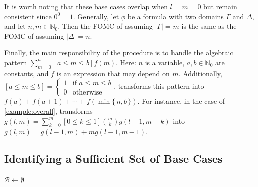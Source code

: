 \documentclass[a4paper,UKenglish,cleveref, autoref, thm-restate]{lipics-v2021}
\begin{document}
It is worth noting that these base cases overlap when $l = m = 0$ but remain
consistent since $0^{0} = 1$. Generally, let $\phi$ be a formula with two
domains $\Gamma$ and $\Delta$, and let $n, m \in \mathbb{N}_{0}$. Then the FOMC
of  assuming $|\Gamma| = m$ is the same as the
FOMC of  assuming $|\Delta| = n$.

Finally, the main responsibility of the \Simplify procedure is to handle the
algebraic pattern $\sum_{m=0}^{n}[a \le m \le b] f(m)$. Here: $n$ is a variable,
$a, b \in \mathbb{N}_{0}$ are constants, and $f$ is an expression that may
depend on $m$. Additionally, $[a \le m \le b] = \begin{cases}
  1 & \text{if $a \le m \le b$} \\
  0 & \text{otherwise}
\end{cases}$.
\Simplify transforms this pattern into
$f(a) + f(a+1) + \cdots + f(\min\{\, n, b \,\})$. For instance, in the case of
\cref{example:overall}, \Simplify transforms
$g(l, m) = \sum_{k=0}^{m}[0 \le k \le 1]\binom{m}{k}g(l-1, m-k)$ into
$g(l, m) = g(l-1, m) + mg(l-1, m-1)$.

\subsection{Identifying a Sufficient Set of Base Cases}\label{sec:identifying}

\begin{algorithm}[t]
  \caption{\protect{}}\label{alg:findbasecases}

  $\mathcal{B} \gets \emptyset$\;
\end{algorithm}
\end{document}
